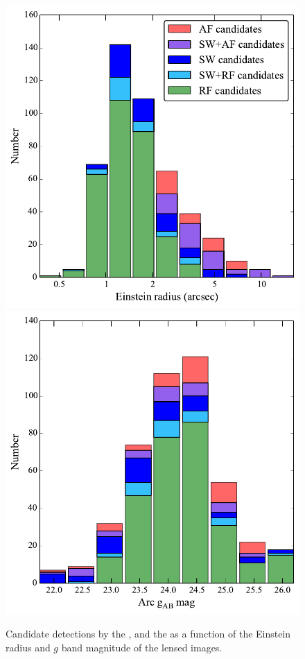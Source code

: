 \documentclass[useAMS,usenatbib,a4paper]{mn2e}
\begin{document}
\begin{figure}
\begin{center}
\includegraphics[scale=0.5]{sw-cfhtls-figs/stacked_lenscand_rein.pdf}
\includegraphics[scale=0.5]{sw-cfhtls-figs/stacked_lenscand_mag.pdf}
\caption{ \label{fig:stackremg}
Candidate detections by the \rf, \sw and the \af as a
function of the Einstein radius and $g$ band magnitude of the lensed
images.
}
\end{center}
\end{figure}
\end{document}
